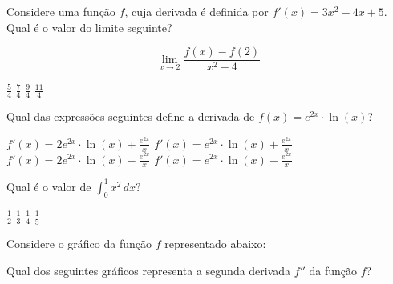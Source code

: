 \documentclass[12pt,a4paper]{exam}
\begin{document}
\begin{questions}

\question
Considere uma função \( f\), cuja derivada é definida por \( f'(x) = 3x^2 - 4x + 5 \). Qual é o valor do limite seguinte?

\[
\lim_{x \to 2} \frac{f(x) - f(2)}{x^2 - 4}
\]

\begin{choices}
    \choice \(\frac{5}{4}\)
    \choice \(\frac{7}{4}\)
    \choice \(\frac{9}{4}\)
    \choice \(\frac{11}{4}\)
\end{choices}

\question
Qual das expressões seguintes define a derivada de $f(x) = e^{2x} \cdot \ln(x)$?
\begin{choices}
    \choice $f'(x) = 2e^{2x} \cdot \ln(x) + \frac{e^{2x}}{x}$
    \choice $f'(x) = e^{2x} \cdot \ln(x) + \frac{e^{2x}}{x}$
    \choice $f'(x) = 2e^{2x} \cdot \ln(x) - \frac{e^{2x}}{x}$
    \choice $f'(x) = e^{2x} \cdot \ln(x) - \frac{e^{2x}}{x}$
\end{choices}

\question
Qual é o valor de $\int_{0}^{1} x^2 \, dx$?
\begin{choices}
    \choice \(\frac{1}{2}\)
    \choice \(\frac{1}{3}\)
    \choice \(\frac{1}{4}\)
    \choice \(\frac{1}{5}\)
\end{choices}

\question
Considere o gráfico da função \( f \) representado abaixo:

\begin{center}
\end{center}

Qual dos seguintes gráficos representa a segunda derivada \( f'' \) da função \( f \)?

\begin{choices}
    \choice 


\end{choices}
\end{questions}
\end{document}
